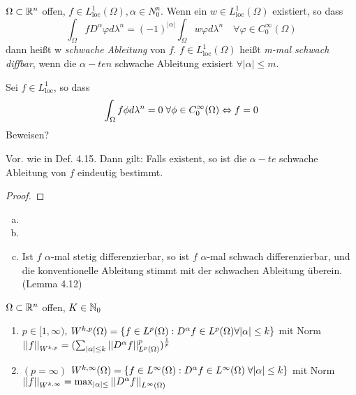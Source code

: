 	\begin{definition}
		$\Omega \subset \mathbb{R}^n$ offen, $f\in L^1_{\text{loc}}(\Omega), \alpha \in N^n_0$. Wenn ein 
		$w \in L^1_{\text{loc}}(\Omega)$ existiert, so dass 
			$$\int_\Omega f D^\alpha \varphi d\lambda^n = (-1)^|\alpha| \int_\Omega w \varphi d\lambda^n 
			\quad \forall \varphi \in C_0^\infty(\Omega)$$
			dann heißt w \textit{schwache Ableitung} von $f$. $f \in L^1_{\text{loc}}(\Omega)$ heißt \textit{m-mal schwach diffbar}, wenn die $\alpha-ten$ schwache Ableitung exisiert $\forall |\alpha| \leq m$. 
	\end{definition}
	
	\begin{bem*}
		Sei $f\in L^1_{\text{loc}}$, so dass 
			$$\int_\Omega f \phi d\lambda^n = 0 \; \forall \phi \in C^\infty_0(\Omega) \overset{}{\Leftrightarrow} f = 0$$
	\todog[Übungsbeweis] Beweisen?
	\end{bem*}

	\begin{thm}
		Vor. wie in Def. 4.15. Dann gilt: Falls existent, so ist die $\alpha-te$ schwache Ableitung von $f$ eindeutig bestimmt. 
	\end{thm}

	\begin{proof}
		\todor	
	\end{proof}

	\begin{bsp}
		\begin{enumerate}[a)]
			\item {}
			\item
			\item Ist $f$ $\alpha$-mal stetig differenzierbar, so ist $f$ $\alpha$-mal schwach differenzierbar, und die konventionelle Ableitung stimmt mit der schwachen Ableitung überein. (Lemma 4.12)
		\end{enumerate}
	\end{bsp}

	\begin{definition}[Sobolevräume]
		$\Omega \subset \mathbb{R}^n$ offen, $K\in\mathbb{N}_0$	
		\begin{enumerate}
			\item $p\in [1,\infty)$, $W^{k,p}(\Omega) = \{f\in L^p(\Omega): D^\alpha f\in L^p(\Omega) \forall |\alpha| \leq k\}$ mit Norm $\left\lvert \left\lvert f \right\rvert \right\rvert_{W^{k,p}} = (\sum_{|\alpha| \leq k} \left\lvert \left\lvert D^\alpha f \right\rvert \right\rvert^p_{L^p(\Omega)})^{\frac{1}{p}}$
		\item $(p = \infty)$ $W^{k,\infty}(\Omega) = \{f\in L^\infty(\Omega): D^\alpha f \in L^\infty(\Omega) \; \forall |\alpha| \leq k\}$ mit Norm $\left\lvert \left\lvert f \right\rvert \right\rvert_{W^{k,\infty}} = \max_{|\alpha| \leq} \left\lvert \left\lvert D^\alpha f \right\rvert \right\rvert_{L^\infty(\Omega)}$
		\end{enumerate}
	\end{definition}

